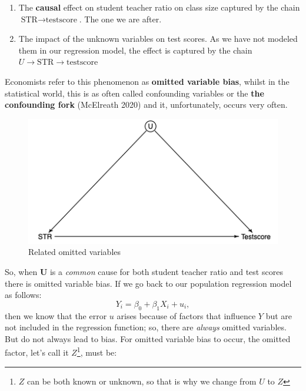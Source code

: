 \documentclass[
]{book}
\providecommand{\tightlist}{%
  \setlength{\itemsep}{0pt}\setlength{\parskip}{0pt}}
\begin{document}
\begin{enumerate}
\def\labelenumi{\arabic{enumi})}
\tightlist
\item
  The \textbf{causal} effect on student teacher ratio on class size captured by the chain \(\text{STR} \longrightarrow \text{testscore}\). The one we are after.
\item
  The impact of the unknown variables on test scores. As we have not modeled them in our regression model, the effect is captured by the chain \(U \longrightarrow \text{STR} \longrightarrow \text{testscore}\)
\end{enumerate}

Economists refer to this phenomenon as \textbf{omitted variable bias}, whilst in the statistical world, this is as often called confounding variables or the \textbf{the confounding fork} (McElreath 2020) and it, unfortunately, occurs very often.

\begin{figure}

{\centering \includegraphics[width=600px]{./figures/Unobshet} 

}

\caption{Related omitted variables}\label{fig:unobshet}
\end{figure}

So, when \textbf{U} is a \emph{common} cause for both student teacher ratio and test scores there is omitted variable bias. If we go back to our population regression model as follows:
\begin{equation}
Y_i = \beta_0 + \beta_1 X_i + u_i,
\end{equation}
then we know that the error \(u\) arises because of factors that influence \(Y\) but are not included in the regression function; so, there are \emph{always} omitted variables. But do not always lead to bias. For omitted variable bias to occur, the omitted factor, let's call it \(Z\)\footnote{\(Z\) can be both known or unknown, so that is why we change from \(U\) to \(Z\)}, must be:
\end{document}
